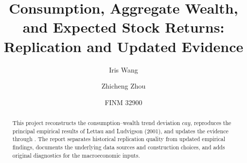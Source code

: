 \documentclass[11pt]{article}
\title{Consumption, Aggregate Wealth, and Expected Stock Returns:\\Replication and Updated Evidence}
\author{Iris Wang \and Zhicheng Zhou}
\date{FINM 32900}
\begin{document}
\maketitle

\begin{abstract}
This project reconstructs the consumption--wealth trend deviation $cay$,
reproduces the principal empirical results of Lettau and Ludvigson (2001),
and updates the evidence through \UpdatedSampleEnd. The report separates
historical replication quality from updated empirical findings, documents the
underlying data sources and construction choices, and adds original diagnostics
for the macroeconomic inputs.
\end{abstract}


\FloatBarrier

\FloatBarrier

\FloatBarrier

\FloatBarrier

\FloatBarrier

\FloatBarrier

\FloatBarrier

\FloatBarrier

\FloatBarrier

\appendix


\printbibliography
\end{document}
